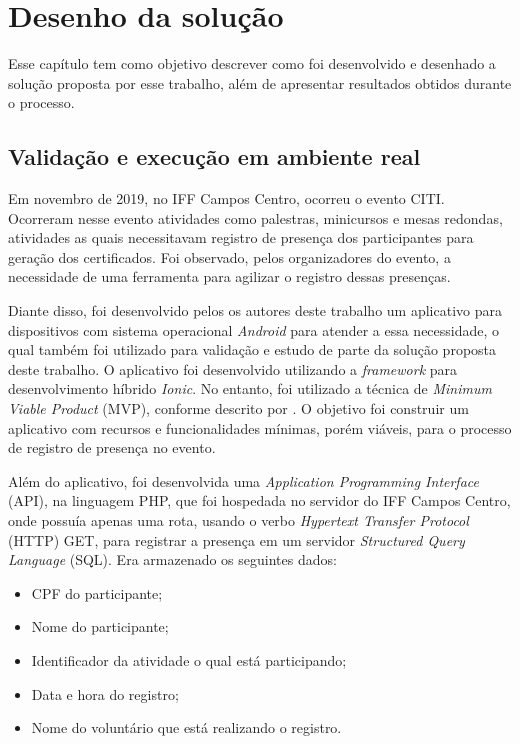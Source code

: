 \chapter{Desenho da solução}

Esse capítulo tem como objetivo descrever como foi desenvolvido e desenhado a solução proposta por esse trabalho, além de apresentar resultados obtidos durante o processo.

\section{Validação e execução em ambiente real}

Em novembro de 2019, no IFF Campos Centro, ocorreu o evento CITI. Ocorreram nesse evento atividades como palestras, minicursos e mesas redondas, atividades as quais necessitavam registro de presença dos participantes para geração dos certificados. Foi observado, pelos organizadores do evento, a necessidade de uma ferramenta para agilizar o registro dessas presenças. 

Diante disso, foi desenvolvido pelos os autores deste trabalho um aplicativo para dispositivos com sistema operacional \textit{Android} para atender a essa necessidade, o qual também foi utilizado para validação e estudo de parte da solução proposta deste trabalho. O aplicativo foi desenvolvido utilizando a \textit{framework} para desenvolvimento híbrido \textit{Ionic}. No entanto, foi utilizado a técnica de \textit{Minimum Viable Product} (MVP), conforme descrito por . O objetivo foi construir um aplicativo com recursos e funcionalidades mínimas, porém viáveis, para o processo de registro de presença no evento.

Além do aplicativo, foi desenvolvida uma \textit{Application Programming Interface} (API), na linguagem PHP, que foi hospedada no servidor do IFF Campos Centro, onde possuía apenas uma rota, usando o verbo \textit{Hypertext Transfer Protocol} (HTTP) GET, para registrar a presença em um servidor \textit{Structured Query Language} (SQL). Era armazenado os seguintes dados:

\begin{itemize}
    \item CPF do participante;
    \item Nome do participante;
    \item Identificador da atividade o qual está participando;
    \item Data e hora do registro;
    \item Nome do voluntário que está realizando o registro.
\end{itemize}

